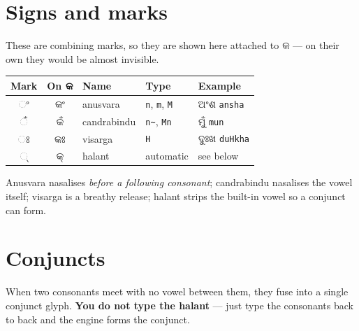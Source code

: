 \documentclass[11pt, a4paper]{article}
\newcommand{\od}[1]{{\odiafont #1}}          %
\newcommand{\odb}[1]{{\odiafont\large #1}}   %
\begin{document}
\section{Signs and marks}

These are combining marks, so they are shown here attached to \od{କ} --- on their own
they would be almost invisible.

\begin{center}
\begin{tabular}{c c l l l}
\toprule
Mark & On \od{କ} & Name & Type & Example \\
\midrule
\odb{ଂ} & \odb{କଂ} & anusvara     & \texttt{n}, \texttt{m}, \texttt{M} & \od{ଅଂଶ} \texttt{ansha} \\
\odb{ଁ} & \odb{କଁ} & candrabindu  & \texttt{n\textasciitilde}, \texttt{Mn} & \od{ମୁଁ} \texttt{mun} \\
\odb{ଃ} & \odb{କଃ} & visarga      & \texttt{H}                         & \od{ଦୁଃଖ} \texttt{duHkha} \\
\odb{୍}  & \odb{କ୍} & halant       & automatic                          & see below \\
\bottomrule
\end{tabular}
\end{center}

Anusvara nasalises \emph{before a following consonant}; candrabindu nasalises the vowel
itself; visarga is a breathy release; halant strips the built-in vowel so a conjunct can
form.

\section{Conjuncts}

When two consonants meet with no vowel between them, they fuse into a single conjunct
glyph. \textbf{You do not type the halant} --- just type the consonants back to back and
the engine forms the conjunct.
\end{document}

